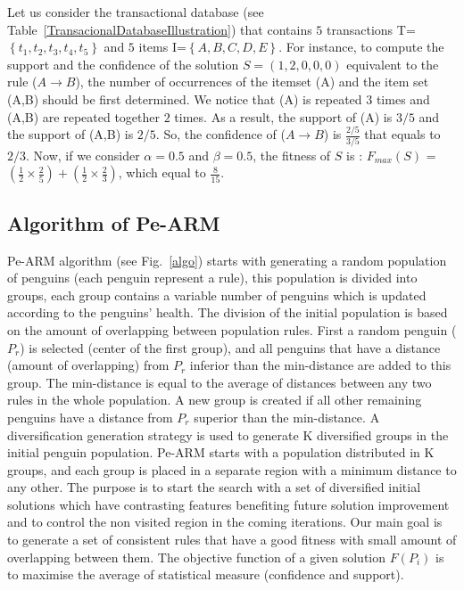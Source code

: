 \documentclass[preprint,12pt]{elsarticle}
\begin{document}
Let us consider the transactional database (see
Table~\ref{TransacionalDatabaseIllustration}) that contains $5$
transactions T=$\left\{t_{1}, t_{2}, t_{3}, t_{4}, t_{5}\right\}$ and
$5$ items I=$\left\{A, B, C, D, E \right\}$. For instance, to compute the support
and the confidence of the solution $S=(1,2,0,0,0)$ equivalent to the
rule ($A \rightarrow B$), the number of occurrences of the itemset
(A) and the item set (A,B) should be first determined. We notice that
(A) is repeated $3$ times and (A,B) are repeated together $2$ times.
As a result, the support of (A) is $3/5$ and the support of
(A,B) is $2/5$. So, the confidence of ($A \rightarrow B$) is
$\frac{2/5}{3/5}$ that equals to $2/3$. Now, if we consider
$\alpha=0.5$ and $\beta=0.5$, the fitness of $S$ is :
$F_{max}(S)$ =  ${\left(\frac{1}{2} \times \frac{2}{5}\right)} + {\left(\frac{1}{2} \times
\frac{2}{3}\right)}$, which equal to $\frac{8}{15}$.

\subsection{Algorithm of Pe-ARM}
Pe-ARM algorithm (see Fig.~\ref{algo}) starts with generating a random population of penguins (each penguin represent a rule), this population is divided into groups, each group contains a variable number of penguins which is updated according to the penguins' health. The division of the initial population is based on the amount of overlapping between population rules. 
First a random penguin ($P_{r}$) is selected (center of the first group), and all penguins that have a distance (amount of overlapping) from $P_{r}$ inferior than the min-distance are added to this group. The min-distance is equal to the average of distances between any two rules in the whole population. A new group is created if all other remaining penguins have a distance  from $P_{r}$ superior than the min-distance.
A diversification generation strategy is used to generate K diversified groups in the initial penguin population. Pe-ARM starts with a population distributed in K groups, and each group is placed in a separate region with a minimum distance to any other. The purpose is to start the search with a set of diversified initial solutions which have contrasting features benefiting future solution improvement and to control the non visited region in the coming iterations. Our main goal is to generate a set of consistent rules that have a good fitness with small amount of overlapping between them. The objective function of a given solution $F(P_{i})$ is to maximise the average of statistical measure (confidence and support).
 
\end{document}
